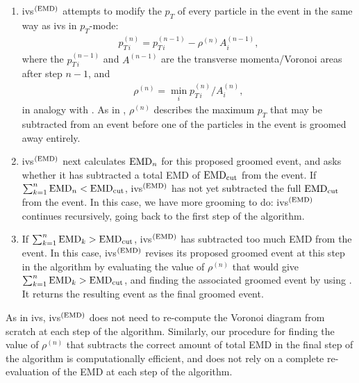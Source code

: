 \begin{subappendices}
\begin{enumerate}
    \item
    \gls{ivs}\(^{(\rm EMD)}\) attempts to modify the \(p_T\) of every particle in the event in the same way as \gls{ivs} in \(p_T\)-mode:
    \begin{align}
	p_{T\,i}^{(n)} = p_{T\,i}^{(n-1)} - \rho^{(n)} A^{(n-1)}_i,
	\label{eq:ivs_emd}
    \end{align}
    where the \(p_{T\,i}^{(n-1)}\) and \(A^{(n-1)}\) are the transverse momenta/Voronoi areas after step \(n-1\), and
    \begin{align}
        \rho^{(n)}
        =
        \min_i p^{(n)}_{T\,i}/A^{(n)}_i
        ,
    \end{align}
    in analogy with .
    As in , \(\rho^{(n)}\) describes the maximum \(p_T\) that may be subtracted from an event before one of the particles in the event is groomed away entirely.

    \item
    \gls{ivs}\(^{(\rm EMD)}\) next calculates \({\rm EMD}_n\) for this proposed groomed event, and asks whether it has subtracted a total EMD of \( {\rm EMD}_{\rm cut}\) from the event.
    If \(\sum_{k = 1}^n {\rm EMD}_n < {\rm EMD}_{\rm cut}\), \gls{ivs}\(^{(\rm EMD)}\) has not yet subtracted the full \({\rm EMD}_{\rm cut}\) from the event.
    In this case, we have more grooming to do:
    \gls{ivs}\(^{(\rm EMD)}\) continues recursively, going back to the first step of the algorithm.

    \item
    If \(\sum_{k = 1}^n {\rm EMD}_k > {\rm EMD}_{\rm cut}\), \gls{ivs}\(^{(\rm EMD)}\) has subtracted too much EMD from the event.
    In this case, \gls{ivs}\(^{(\rm EMD)}\) revises its proposed groomed event at this step in the algorithm by evaluating the value of \(\rho^{(n)}\) that would give \(\sum_{k = 1}^n {\rm EMD}_k > {\rm EMD}_{\rm cut}\), and finding the associated groomed event by using .
    It returns the resulting event as the final groomed event.
\end{enumerate}
As in \gls{ivs}, \gls{ivs}\(^{(\rm EMD)}\) does not need to re-compute the Voronoi diagram from scratch at each step of the algorithm.
%
Similarly, our procedure for finding the value of \(\rho^{(n)}\) that subtracts the correct amount of total EMD in the final step of the algorithm is computationally efficient, and does not rely on a complete re-evaluation of the EMD at each step of the algorithm.



\end{subappendices}
